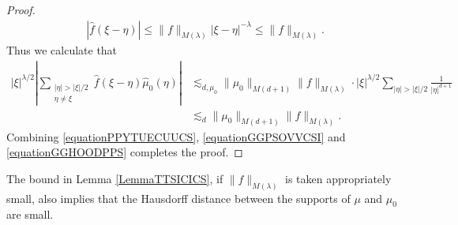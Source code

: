 \documentclass[dvipsnames,letterpaper,12pt]{article}
\numberwithin{equation}{section}
\numberwithin{theorem}{section}
\begin{document}
\begin{proof}
\begin{equation}
\begin{split}
        |\widehat{f}(\xi - \eta)| \leq  \| f \|_{M(\lambda)} |\xi - \eta|^{-\lambda} \leq \| f \|_{M(\lambda)}.
    \end{split}
    \end{equation}
    Thus we calculate that
    \begin{equation} \label{equationGGHOODPPS}
    \begin{split}
        |\xi|^{\lambda/2} \left| \sum_{\substack{|\eta| > |\xi|/2\\ \eta \neq \xi}} \widehat{f}(\xi - \eta) \widehat{\mu}_0(\eta) \right| &\lesssim_{d,\mu_0} \| \mu_0 \|_{M(d+1)} \| f \|_{M(\lambda)} \cdot |\xi|^{\lambda/2} \sum_{|\eta| > |\xi|/2} \frac{1}{|\eta|^{d+1}}\\
        &\lesssim_d \| \mu_0 \|_{M(d+1)} \| f \|_{M(\lambda)}.
    \end{split}
    \end{equation}
    Combining \eqref{equationPPYTUECUUCS}, \eqref{equationGGPSOVVCSI} and \eqref{equationGGHOODPPS} completes the proof.
\end{proof}

The bound in Lemma \ref{LemmaTTSICICS}, if $\| f \|_{M(\lambda)}$ is taken appropriately small, also implies that the Hausdorff distance between the supports of $\mu$ and $\mu_0$ are small.
\end{document}
